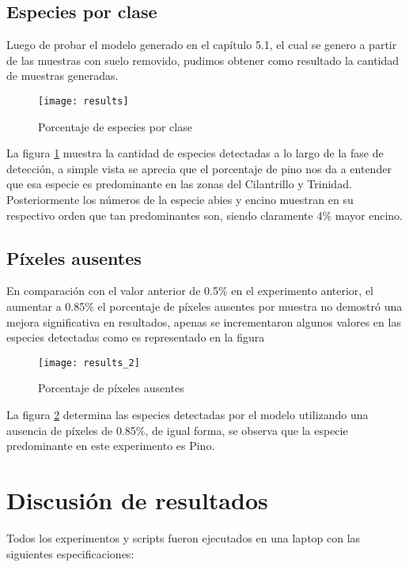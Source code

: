 \subsection{Especies por clase}
Luego de probar el modelo generado en el capítulo 5.1, el cual se genero a partir de las muestras con suelo removido, pudimos obtener como resultado la cantidad de muestras generadas.

\begin{figure}[h!]
  \centering  
  \begin{minipage}[b]{1\textwidth}
        \texttt{[image: results]}
    \caption{Porcentaje de especies por clase} 
    \label{Porcentaje de especies por clase}
  \end{minipage}
\end{figure}
\break
La figura \ref{Porcentaje de especies por clase} muestra la cantidad de especies detectadas a lo largo de la fase de detección, a simple vista se aprecia que el porcentaje de pino nos da a entender que esa especie es predominante en las zonas del Cilantrillo y Trinidad. Posteriormente los números de la especie abies y encino muestran en su respectivo orden que tan predominantes son, siendo claramente 4\% mayor encino.

\subsection{Píxeles ausentes}
En comparación con el valor anterior de 0.5\% en el experimento anterior, el aumentar a 0.85\% el porcentaje de píxeles ausentes por muestra no demostró una mejora significativa en resultados, apenas se incrementaron algunos valores en las especies detectadas como es representado en la figura 

\begin{figure}[h!]
  \centering  
  \begin{minipage}[b]{1\textwidth}
        \texttt{[image: results\_2]}
    \caption{Porcentaje de píxeles ausentes} 
    \label{Porcentaje de píxeles ausentes}
  \end{minipage}
\end{figure}
\break
La figura \ref{Porcentaje de píxeles ausentes} determina las especies detectadas por el modelo utilizando una ausencia de píxeles de 0.85\%, de igual forma, se observa que la especie predominante en este experimento es Pino.

\section{Discusión de resultados}
Todos los experimentos y scripts fueron ejecutados en una laptop con las siguientes especificaciones:

